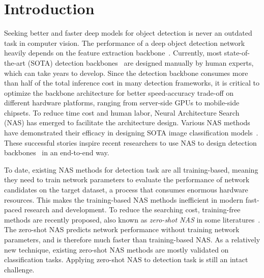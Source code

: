 \documentclass[nohyperref]{article}
\theoremstyle{plain}
\theoremstyle{definition}
\theoremstyle{remark}
\begin{document}
\section{Introduction}


Seeking better and faster deep models for object detection is never an outdated task in computer vision. The performance of a deep object detection network heavily depends on the feature extraction backbone~\citep{detnet,detnas}. Currently, most state-of-the-art (SOTA) detection backbones~\citep{resnet,resnext,dcn,li2021ds} are designed manually by human experts, which can take years to develop. Since the detection backbone consumes more than half of the total inference cost in many detection frameworks, it is critical to optimize the backbone architecture for better speed-accuracy trade-off on different hardware platforms, ranging from server-side GPUs to mobile-side chipsets. To reduce time cost and human labor, Neural Architecture Search (NAS) has emerged to facilitate the architecture design. Various NAS methods have demonstrated their efficacy in designing SOTA image classification models~\citep{nasnet,darts,ofa,efficient,fna}. These successful stories inspire recent researchers to use NAS to design detection backbones~\citep{detnas,peng2019efficient,mobiledets,spinenet,spnas} in an end-to-end way.

To date, existing NAS methods for detection task are all training-based, meaning they need to train network parameters to evaluate the performance of network candidates on the target dataset, a process that consumes enormous hardware resources. This makes the training-based NAS methods inefficient in modern fast-paced research and development. To reduce the searching cost, training-free methods are recently proposed, also known as \textit{zero-shot NAS} in some literatures~\citep{syn,naswot,ntk,zennas}. The zero-shot NAS predicts network performance without training network parameters, and is therefore much faster than training-based NAS. As a relatively new technique, existing zero-shot NAS methods are mostly validated on classification tasks. Applying zero-shot NAS to detection task is still an intact challenge.
\end{document}
